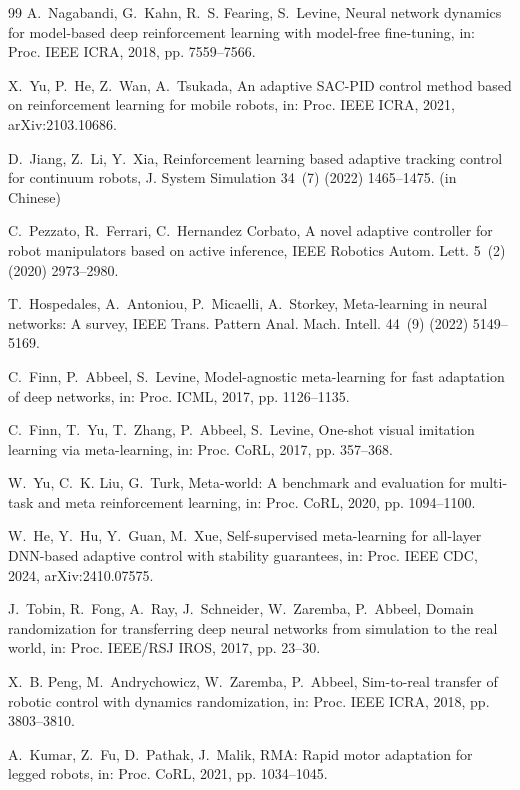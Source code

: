 \documentclass[a4paper]{cas-sc}
\begin{document}
\begin{thebibliography}{99}
A.~Nagabandi, G.~Kahn, R.~S. Fearing, S.~Levine, Neural network dynamics for model-based deep reinforcement learning with model-free fine-tuning, in: Proc. IEEE ICRA, 2018, pp. 7559--7566.

X.~Yu, P.~He, Z.~Wan, A.~Tsukada, An adaptive SAC-PID control method based on reinforcement learning for mobile robots, in: Proc. IEEE ICRA, 2021, arXiv:2103.10686.

D.~Jiang, Z.~Li, Y.~Xia, Reinforcement learning based adaptive tracking control for continuum robots, J. System Simulation 34~(7) (2022) 1465--1475. (in Chinese)

C.~Pezzato, R.~Ferrari, C.~Hernandez Corbato, A novel adaptive controller for robot manipulators based on active inference, IEEE Robotics Autom. Lett. 5~(2) (2020) 2973--2980.

T.~Hospedales, A.~Antoniou, P.~Micaelli, A.~Storkey, Meta-learning in neural networks: A survey, IEEE Trans. Pattern Anal. Mach. Intell. 44~(9) (2022) 5149--5169.

C.~Finn, P.~Abbeel, S.~Levine, Model-agnostic meta-learning for fast adaptation of deep networks, in: Proc. ICML, 2017, pp. 1126--1135.

C.~Finn, T.~Yu, T.~Zhang, P.~Abbeel, S.~Levine, One-shot visual imitation learning via meta-learning, in: Proc. CoRL, 2017, pp. 357--368.

W.~Yu, C.~K. Liu, G.~Turk, Meta-world: A benchmark and evaluation for multi-task and meta reinforcement learning, in: Proc. CoRL, 2020, pp. 1094--1100.

W.~He, Y.~Hu, Y.~Guan, M.~Xue, Self-supervised meta-learning for all-layer DNN-based adaptive control with stability guarantees, in: Proc. IEEE CDC, 2024, arXiv:2410.07575.

J.~Tobin, R.~Fong, A.~Ray, J.~Schneider, W.~Zaremba, P.~Abbeel, Domain randomization for transferring deep neural networks from simulation to the real world, in: Proc. IEEE/RSJ IROS, 2017, pp. 23--30.

X.~B. Peng, M.~Andrychowicz, W.~Zaremba, P.~Abbeel, Sim-to-real transfer of robotic control with dynamics randomization, in: Proc. IEEE ICRA, 2018, pp. 3803--3810.

A.~Kumar, Z.~Fu, D.~Pathak, J.~Malik, RMA: Rapid motor adaptation for legged robots, in: Proc. CoRL, 2021, pp. 1034--1045.


\end{thebibliography}
\end{document}
